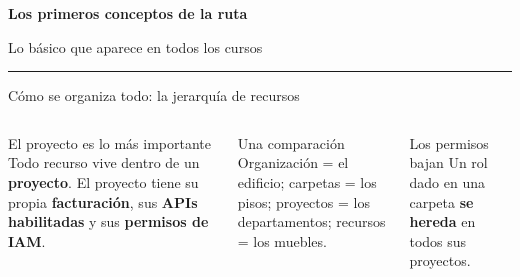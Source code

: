 \documentclass[aspectratio=169,10pt,c]{beamer}
\begin{document}
\begin{frame}[plain]
\vfill
\begin{center}
{\fontsize{29}{34}\selectfont\bfseries Los primeros conceptos de la ruta}\par
\vspace{2mm}
{\small Lo básico que aparece en todos los cursos}\par
\vspace{4mm}
{\color{utpRojo}\rule{8.5cm}{1.2pt}}
\end{center}
\vfill
\end{frame}

\begin{frame}{Cómo se organiza todo: la jerarquía de recursos}
\begin{columns}[c,onlytextwidth]
\centering
{}
\begin{block}{El proyecto es lo más importante}
\small Todo recurso vive dentro de un \textbf{proyecto}. El proyecto tiene su propia \textbf{facturación}, sus \textbf{APIs habilitadas} y sus \textbf{permisos de IAM}.
\end{block}
\begin{exampleblock}{Una comparación}
\small Organización = el edificio; carpetas = los pisos; proyectos = los departamentos; recursos = los muebles.
\end{exampleblock}
\begin{alertblock}{Los permisos bajan}
\small Un rol dado en una carpeta \textbf{se hereda} en todos sus proyectos.
\end{alertblock}
\end{columns}
\end{frame}
\end{document}
